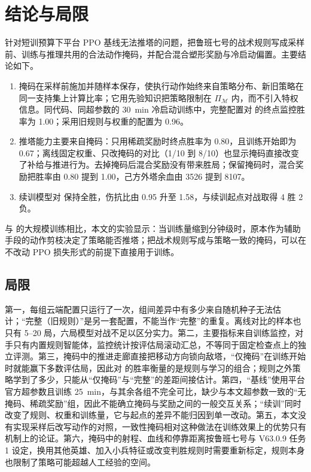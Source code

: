 \section{结论与局限}
\label{sec:conclusion}

针对短训预算下平台 PPO 基线无法推塔的问题，把鲁班七号的战术规则写成采样前、训练与推理共用的合法动作掩码，并配合混合塑形奖励与冷启动偏置。主要结论如下。

\begin{enumerate}
  \item 掩码在采样前施加并随样本保存，使执行动作始终来自策略分布、新旧策略在同一支持集上计算比率；它用先验知识把策略限制在 $\Pi_{\mathcal M}$ 内，而不引入特权信息。同代码、同超参数的 \qty{30}{\minute} 冷启动训练中，完整配置对  的终点监控胜率为 \num{1.00}；采用旧规则与权重的配置为 \num{0.96}。
  \item 推塔能力主要来自掩码：只用稀疏奖励时终点胜率为 \num{0.80}，且训练开始即为 \num{0.67}；离线固定权重、只改掩码的对比（\num{1}/\num{10} 到 \num{8}/\num{10}）也显示掩码直接改变了补给与推进行为。去掉掩码后混合奖励没有带来胜局；保留掩码时，混合奖励把胜率由 \num{0.80} 提到 \num{1.00}，己方外塔余血由 \num{3526} 提到 \num{8107}。
  \item 续训模型对  保持全胜，伤抗比由 \num{0.95} 升至 \num{1.58}，与续训起点对战取得 \num{4} 胜 \num{2} 负。
\end{enumerate}

与 \textcite{ye2020mastering} 的大规模训练相比，本文的实验显示：当训练量缩到分钟级时，原本作为辅助手段的动作剪枝决定了策略能否推塔；把战术规则写成与策略一致的掩码，可以在不改动 PPO 损失形式的前提下直接用于训练。

\subsection{局限}
\label{sec:limitations}

第一，每组云端配置只运行了一次，组间差异中有多少来自随机种子无法估计；“完整（旧规则）”是另一套配置，不能当作“完整”的重复。离线对比的样本也只有 \numrange{5}{20} 局，六局模型对战不足以区分实力。第二，主要指标来自训练监控，对手只有内置规则智能体，监控统计按评估局滚动汇总，不等同于固定检查点上的独立评测。第三，掩码中的推进走廊直接把移动方向锁向敌塔，“仅掩码”在训练开始时就能赢下多数评估局，因此对  的胜率衡量的是规则与学习的组合；规则之外策略学到了多少，只能从“仅掩码”与“完整”的差距间接估计。第四，“基线”使用平台官方超参数且训练 \qty{25}{\minute}，与其余各组不完全可比，缺少与本文超参数一致的“无掩码、稀疏奖励”组，因此不能确立掩码与奖励之间的一般交互关系；“续训”同时改变了规则、权重和训练量，它与起点的差异不能归因到单一改动。第五，本文没有实现采样后改写动作的对照，一致性掩码相对这种做法在训练效果上的优势只有机制上的论证。第六，掩码中的射程、血线和停靠距离按鲁班七号与 V63.0.9 任务 1 设定，换用其他英雄、加入小兵特征或改变判胜规则时需要重新标定，规则本身也限制了策略可能超越人工经验的空间。

